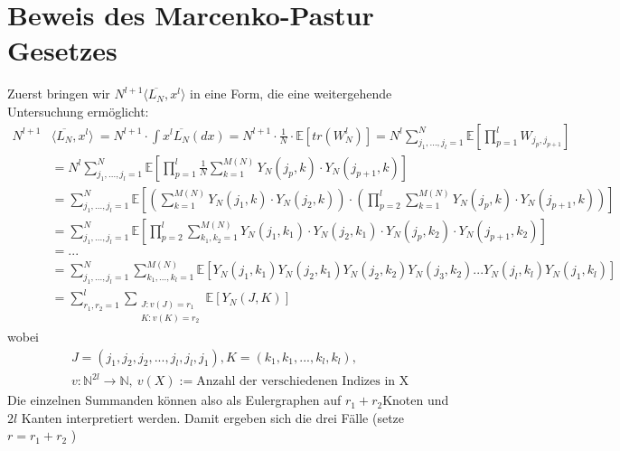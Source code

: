 \documentclass[a4paper, 11pt]{scrreprt}
\newcommand{\EE}{\mathbb{E}}
\newcommand{\NN}{\mathbb{N}}
\begin{document}
\section{Beweis des Marcenko-Pastur Gesetzes}
Zuerst bringen wir \(N^{l+1} \langle \overline{L_N}, x^l \rangle\) in eine Form, die eine weitergehende Untersuchung ermöglicht:
\begin{equation}
\begin{split}
		N^{l+1} &\langle \overline{L_N}, x^l \rangle\ 
		= N^{l+1} \cdot \int x^l \overline{L_N}(dx) 
		= N^{l+1} \cdot \frac{1}{N} \cdot \EE[tr(W^l_N)] 
		= N^l \sum_{j_1,...,j_l = 1}^N \EE\left[\prod_{p = 1}^l W_{j_p,j_{p+1}}\right] \\
		&= N^l \sum_{j_1,...,j_l = 1}^N \EE\left[\prod_{p = 1}^l \frac{1}{N} \sum_{k = 1}^{M(N)} Y_N(j_p,k) \cdot Y_N(j_{p+1},k) \right] \\
		&= \sum_{j_1,...,j_l = 1}^N \EE \left[\left(\sum_{k = 1}^{M(N)} Y_N(j_1,k) \cdot Y_N(j_2,k)\right) \cdot \left(\prod_{p = 2}^l \sum_{k = 1}^{M(N)} Y_N(j_p,k) \cdot Y_N(j_{p+1},k) \right) \right] \\
		&= \sum_{j_1,...,j_l = 1}^N \EE\left[	\prod_{p = 2}^l \sum_{k_1,k_2 = 1}^{M(N)} Y_N(j_1,k_1) \cdot Y_N(j_2,k_1) \cdot Y_N(j_p,k_2) \cdot Y_N(j_{p+1},k_2) \right] \\
		&= ... \\
		&= \sum_{j_1,...,j_l = 1}^N \sum_{k_1,...,k_l = 1}^{M(N)} \EE[Y_N(j_1,k_1) Y_N(j_2,k_1) Y_N(j_2,k_2) Y_N(j_3,k_2) ... Y_N(j_l,k_l) Y_N(j_1,k_l)]\\
 &= \sum_{r_1,r_2 = 1}^l \sum_{\substack{J:v(J)=r_1\\ K:v(K)=r_2 }} \EE[Y_N(J,K)]
\end{split}
\end{equation}
wobei 
\begin{align*}
	&J=(j_1,j_2,j_2,...,j_l,j_l,j_1), K=(k_1,k_1,...,k_l,k_l),\\
	&v: \NN^{2l}\to \NN,\ v(X) := \text{Anzahl der verschiedenen Indizes in X}
\end{align*}
Die einzelnen Summanden können also als Eulergraphen auf \(r_1+r_2 \)Knoten und \(2l\) Kanten interpretiert werden.
Damit ergeben sich die drei Fälle (setze \(r = r_1+r_2\) )
\end{document}
